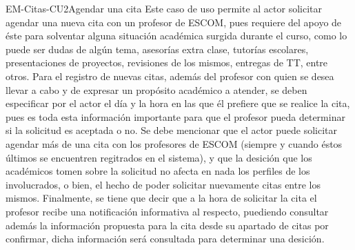 \begin{UseCase}{EM-Citas-CU2}{Agendar una cita}{
	\noindent
	Este caso de uso permite al actor solicitar agendar una nueva cita con un profesor de ESCOM, pues requiere del apoyo de éste para solventar alguna situación académica surgida durante el curso, como lo puede ser dudas de algún tema, asesorías extra clase, tutorías escolares, presentaciones de proyectos, revisiones de los mismos, entregas de TT, entre otros.
	\newline
	Para el registro de nuevas citas, además del profesor con quien se desea llevar a cabo y de expresar un propósito académico a atender, se deben especificar por el actor el día y la hora en las que él prefiere que se realice la cita, pues es toda esta información importante para que el profesor pueda determinar si la solicitud es aceptada o no.
	\newline
	Se debe mencionar que el actor puede solicitar agendar más de una cita con los profesores de ESCOM (siempre y cuando éstos últimos se encuentren regitrados en el sistema), y que la desición que los académicos tomen sobre la solicitud no afecta en nada los perfiles de los involucrados, o bien, el hecho de poder solicitar nuevamente citas entre los mismos. Finalmente, se tiene que decir que a la hora de solicitar la cita el profesor recibe una notificación informativa al respecto, puediendo consultar además la información propuesta para la cita desde su apartado de citas por confirmar, dicha información será consultada para determinar una desición. 
	\newline
	}
\end{UseCase}
